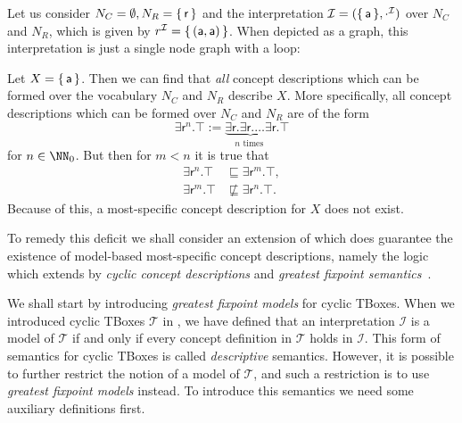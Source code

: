 \begin{Example}
  \label{expl:mmscs-may-not-exist-in-ELbot}
  Let us consider $N_C = \emptyset, N_R = {\{\, \mathsf{r} \,\}}$ and the interpretation
  $\mathcal{I} = ({\{\,\mathsf{a}\,\}}, \cdot^{\mathcal{I}})$ over $N_C$ and $N_R$, which is
  given by $r^{\mathcal{I}} = {\{\, (\mathsf{a}, \mathsf{a}) \,\}}$.  When depicted as a
  graph, this interpretation is just a single node graph with a loop:
  \begin{center}
  \end{center}
  Let $X = {\{\, \mathsf{a} \,\}}$.  Then we can find that \emph{all} \EL concept descriptions
  which can be formed over the vocabulary $N_C$ and $N_R$ describe $X$.  More
  specifically, all \EL concept descriptions which can be formed over $N_C$ and $N_R$ are
  of the form
  \begin{equation*}
    \exists \mathsf{r}^n. \top := \underbrace{\exists \mathsf{r}. \exists \mathsf{r}. \dots \exists
      \mathsf{r}}_{n \text{ times }}. \top
  \end{equation*}
  for $n \in \NN_0$.  But then for $m < n$ it is true that
  \begin{align*}
    \exists \mathsf{r}^{n}. \top &\sqsubseteq \exists \mathsf{r}^m. \top, \\
    \exists \mathsf{r}^{m}. \top &\not\sqsubseteq \exists \mathsf{r}^n. \top.
  \end{align*}
  Because of this, a most-specific concept description for $X$ does not exist.
\end{Example}

To remedy this deficit we shall consider an extension of \ELbot which does guarantee the
existence of model-based most-specific concept descriptions, namely the logic \ELgfpbot
which extends \ELbot by \emph{cyclic concept descriptions} and \emph{greatest fixpoint
  semantics}~\cite{DBLP:conf/ijcai/Baader03a,sowa/Nebel91}.

We shall start by introducing \emph{greatest fixpoint models} for cyclic TBoxes.  When we
introduced cyclic TBoxes $\mathcal{T}$ in , we
have defined that an interpretation $\mathcal{I}$ is a model of $\mathcal{T}$ if and only
if every concept definition in $\mathcal{T}$ holds in $\mathcal{I}$.  This form of
semantics for cyclic TBoxes is called \emph{descriptive} semantics.  However, it is
possible to further restrict the notion of a model of $\mathcal{T}$, and such a
restriction is to use \emph{greatest fixpoint models} instead.  To introduce this
semantics we need some auxiliary definitions first.

